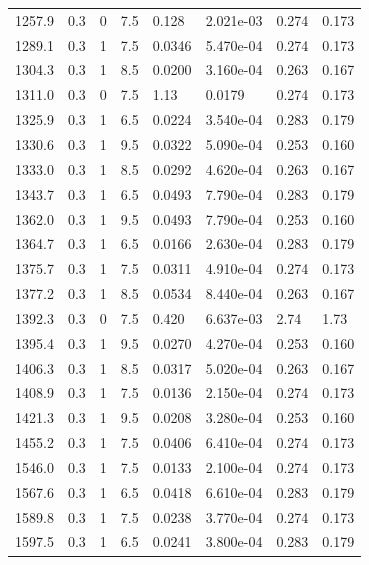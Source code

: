 \documentclass[preview]{standalone}
\begin{document}
{{{\begin{tabular}{L{1.2cm}C{1.2cm} C{0.3cm}C{0.5cm} C{1.4cm}C{1.4cm} C{1.4cm}C{1.4cm}}
  1257.9  &   0.3  & 0     & 7.5 &  0.128  & 2.021e-03  & 0.274 &  0.173   \\ 
  1289.1  &   0.3  & 1     & 7.5 &  0.0346  & 5.470e-04  & 0.274 &  0.173   \\ 
  1304.3  &   0.3  & 1     & 8.5 &  0.0200  & 3.160e-04  & 0.263 &  0.167   \\ 
  1311.0  &   0.3  & 0     & 7.5 &  1.13  & 0.0179  & 0.274 &  0.173   \\ 
  1325.9  &   0.3  & 1     & 6.5 &  0.0224  & 3.540e-04  & 0.283 &  0.179   \\ 
  1330.6  &   0.3  & 1     & 9.5 &  0.0322  & 5.090e-04  & 0.253 &  0.160   \\ 
  1333.0  &   0.3  & 1     & 8.5 &  0.0292  & 4.620e-04  & 0.263 &  0.167   \\ 
  1343.7  &   0.3  & 1     & 6.5 &  0.0493  & 7.790e-04  & 0.283 &  0.179   \\ 
  1362.0  &   0.3  & 1     & 9.5 &  0.0493  & 7.790e-04  & 0.253 &  0.160   \\ 
  1364.7  &   0.3  & 1     & 6.5 &  0.0166  & 2.630e-04  & 0.283 &  0.179   \\ 
  1375.7  &   0.3  & 1     & 7.5 &  0.0311  & 4.910e-04  & 0.274 &  0.173   \\ 
  1377.2  &   0.3  & 1     & 8.5 &  0.0534  & 8.440e-04  & 0.263 &  0.167   \\ 
  1392.3  &   0.3  & 0     & 7.5 &  0.420  & 6.637e-03  & 2.74 &  1.73   \\ 
  1395.4  &   0.3  & 1     & 9.5 &  0.0270  & 4.270e-04  & 0.253 &  0.160   \\ 
  1406.3  &   0.3  & 1     & 8.5 &  0.0317  & 5.020e-04  & 0.263 &  0.167   \\ 
  1408.9  &   0.3  & 1     & 7.5 &  0.0136  & 2.150e-04  & 0.274 &  0.173   \\ 
  1421.3  &   0.3  & 1     & 9.5 &  0.0208  & 3.280e-04  & 0.253 &  0.160   \\ 
  1455.2  &   0.3  & 1     & 7.5 &  0.0406  & 6.410e-04  & 0.274 &  0.173   \\ 
  1546.0  &   0.3  & 1     & 7.5 &  0.0133  & 2.100e-04  & 0.274 &  0.173   \\ 
  1567.6  &   0.3  & 1     & 6.5 &  0.0418  & 6.610e-04  & 0.283 &  0.179   \\ 
  1589.8  &   0.3  & 1     & 7.5 &  0.0238  & 3.770e-04  & 0.274 &  0.173   \\ 
  1597.5  &   0.3  & 1     & 6.5 &  0.0241  & 3.800e-04  & 0.283 &  0.179   \\ 

\end{tabular}}}}
\end{document}
